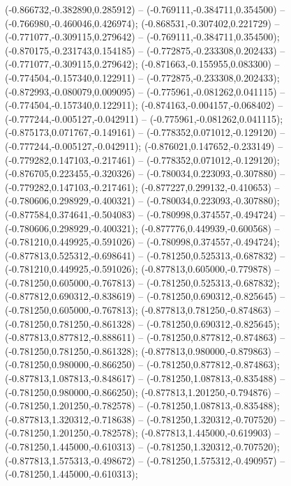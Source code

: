  (-0.866732,-0.382890,0.285912) -- (-0.769111,-0.384711,0.354500) -- (-0.766980,-0.460046,0.426974);
 (-0.868531,-0.307402,0.221729) -- (-0.771077,-0.309115,0.279642) -- (-0.769111,-0.384711,0.354500);
 (-0.870175,-0.231743,0.154185) -- (-0.772875,-0.233308,0.202433) -- (-0.771077,-0.309115,0.279642);
 (-0.871663,-0.155955,0.083300) -- (-0.774504,-0.157340,0.122911) -- (-0.772875,-0.233308,0.202433);
 (-0.872993,-0.080079,0.009095) -- (-0.775961,-0.081262,0.041115) -- (-0.774504,-0.157340,0.122911);
 (-0.874163,-0.004157,-0.068402) -- (-0.777244,-0.005127,-0.042911) -- (-0.775961,-0.081262,0.041115);
 (-0.875173,0.071767,-0.149161) -- (-0.778352,0.071012,-0.129120) -- (-0.777244,-0.005127,-0.042911);
 (-0.876021,0.147652,-0.233149) -- (-0.779282,0.147103,-0.217461) -- (-0.778352,0.071012,-0.129120);
 (-0.876705,0.223455,-0.320326) -- (-0.780034,0.223093,-0.307880) -- (-0.779282,0.147103,-0.217461);
 (-0.877227,0.299132,-0.410653) -- (-0.780606,0.298929,-0.400321) -- (-0.780034,0.223093,-0.307880);
 (-0.877584,0.374641,-0.504083) -- (-0.780998,0.374557,-0.494724) -- (-0.780606,0.298929,-0.400321);
 (-0.877776,0.449939,-0.600568) -- (-0.781210,0.449925,-0.591026) -- (-0.780998,0.374557,-0.494724);
 (-0.877813,0.525312,-0.698641) -- (-0.781250,0.525313,-0.687832) -- (-0.781210,0.449925,-0.591026);
 (-0.877813,0.605000,-0.779878) -- (-0.781250,0.605000,-0.767813) -- (-0.781250,0.525313,-0.687832);
 (-0.877812,0.690312,-0.838619) -- (-0.781250,0.690312,-0.825645) -- (-0.781250,0.605000,-0.767813);
 (-0.877813,0.781250,-0.874863) -- (-0.781250,0.781250,-0.861328) -- (-0.781250,0.690312,-0.825645);
 (-0.877813,0.877812,-0.888611) -- (-0.781250,0.877812,-0.874863) -- (-0.781250,0.781250,-0.861328);
 (-0.877813,0.980000,-0.879863) -- (-0.781250,0.980000,-0.866250) -- (-0.781250,0.877812,-0.874863);
 (-0.877813,1.087813,-0.848617) -- (-0.781250,1.087813,-0.835488) -- (-0.781250,0.980000,-0.866250);
 (-0.877813,1.201250,-0.794876) -- (-0.781250,1.201250,-0.782578) -- (-0.781250,1.087813,-0.835488);
 (-0.877813,1.320312,-0.718638) -- (-0.781250,1.320312,-0.707520) -- (-0.781250,1.201250,-0.782578);
 (-0.877813,1.445000,-0.619903) -- (-0.781250,1.445000,-0.610313) -- (-0.781250,1.320312,-0.707520);
 (-0.877813,1.575313,-0.498672) -- (-0.781250,1.575312,-0.490957) -- (-0.781250,1.445000,-0.610313);

